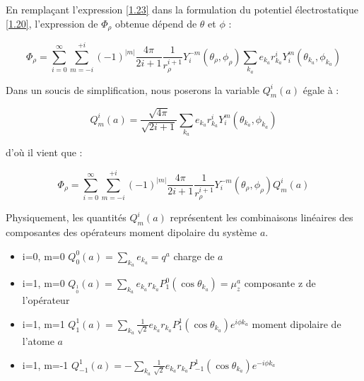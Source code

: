 	En remplaçant l'expression \ref{1.23} dans la formulation du potentiel électrostatique \ref{1.20}, l'expression de $\Phi_{\rho}$ obtenue dépend de $\theta$ et $\phi$ : 
	
	\begin{equation}
	\Phi_{\rho} = \sum_{i=0}^{\infty} \sum_{m=-i}^{+i} (-1)^{|m|}\frac{4\pi}{2i +1} \frac{1}{r_{\rho}^{i+1}} Y_{i}^{-m} (\theta_{\rho},\phi_{\rho}) \sum_{k_{a}} e_{k_{a}}r^{i}_{k_{a}} Y^{m}_{i} (\theta_{k_{a}}, \phi_{k_{a}})
	\end{equation}
	
	Dans un soucis de simplification, nous poserons la variable $Q_{m}^{i}(a)$ égale à : 
	
	\begin{equation}
	Q_{m}^{i}(a)= \frac{\sqrt{4\pi}}{\sqrt{2i + 1}} \sum_{k_{a}} e_{k_{a}}r_{k_{a}}^{i} Y_{i}^{m} (\theta_{k_{a}}, \phi_{k_{a}}) \label{1.25}
	\end{equation}
	
	\noindent d'où il vient que :
	
	\begin{equation}
	\Phi_{\rho} = \sum_{i=0}^{\infty} \sum_{m=-i}^{+i} (-1)^{|m|} \frac{4\pi}{2i +1} \frac{1}{r_{\rho}^{i+1}} Y_{i}^{-m} (\theta_{\rho},\phi_{\rho})Q_{m}^{i}(a)
	\end{equation}
	
	Physiquement, les quantités $Q_{m}^{i}(a)$ représentent les combinaisons linéaires des composantes des opérateurs moment dipolaire du système $a$. 
	
	\begin{itemize}
		\item i=0, m=0 \hspace{0.9cm} $Q_{0}^{0}(a) = \sum_{k_{a}} e_{k_{a}} = q^{a}$ \hspace{3.5cm} charge de $a$
		\item i=1, m=0 \hspace{0.9cm} $Q_{_{0}^{1}}(a)= \sum_{k_{a}} e_{k_{a}} r_{k_{a}} P^{0}_{1} (\cos\theta_{k_{a}}) = \mu_{z}^{a}$ \hspace{1cm} composante z de l'opérateur	
		\item i=1, m=1 \hspace{0.9cm} $Q_{1}^{1}(a)= \sum_{k_{a}} \frac{1}{\sqrt{2}}e_{k_{a}} r_{k_{a}} P^{1}_{1} (\cos\theta_{k_{a}}) e^{i\phi k_{a}}$ \hspace{0.6cm} moment dipolaire de l'atome $a$
		\item i=1, m=-1 \hspace{0.9cm} $Q_{-1}^{1}(a) = -\sum_{k_{a}} \frac{1}{\sqrt{2}}e_{k_{a}} r_{k_{a}} P^{1}_{-1} (\cos\theta_{k_{a}}) e^{-i\phi k_{a}}$
	\end{itemize}
	
